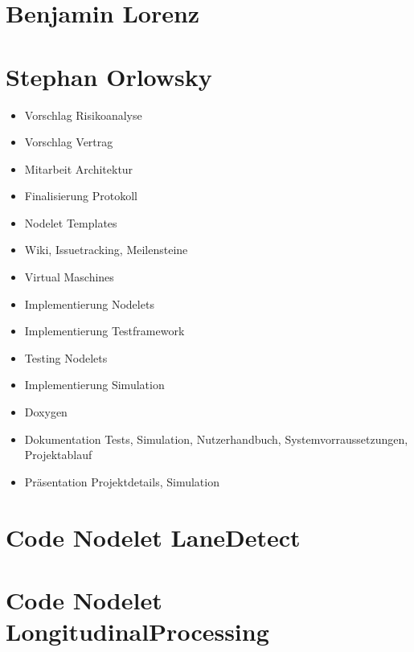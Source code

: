 \documentclass[a4paper, 12pt, titlepage]{scrartcl}
\begin{document}
{	\section{Benjamin Lorenz}
	\section{Stephan Orlowsky}
	\begin{itemize}
		\item Vorschlag Risikoanalyse
		\item Vorschlag Vertrag
		\item Mitarbeit Architektur
		\item Finalisierung Protokoll
		\item Nodelet Templates
		\item Wiki, Issuetracking, Meilensteine
		\item Virtual Maschines
		\item Implementierung Nodelets
		\item Implementierung Testframework
		\item Testing Nodelets
		\item Implementierung Simulation
		\item Doxygen
		\item Dokumentation Tests, Simulation, Nutzerhandbuch, Systemvorraussetzungen, Projektablauf
		\item Präsentation Projektdetails, Simulation
	\end{itemize}

\newpage
\printbibliography

%
\renewcommand\appendixtocname{Anhang} %
\renewcommand\appendixpagename{Anhang}
\renewcommand\appendixname{Anhang}

\newpage
\begin{appendices}
\section{Code Nodelet LaneDetect}
\lstset{style=customcpp,inputpath=../modules/platooning_ws/src/platooning/include/platooning}

\lstset{style=customcpp,inputpath=../modules/platooning_ws/src/platooning/src}

\section{Code Nodelet LongitudinalProcessing}
\lstset{style=customcpp,inputpath=../modules/platooning_ws/src/platooning/include/platooning}

\lstset{style=customcpp,inputpath=../modules/platooning_ws/src/platooning/src}


\end{appendices}}
\end{document}
